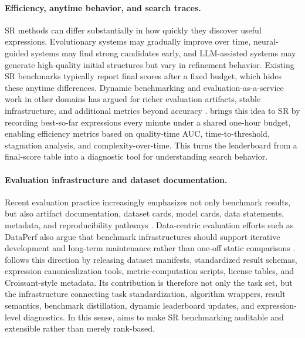 \paragraph{Efficiency, anytime behavior, and search traces.}
SR methods can differ substantially in how quickly they discover useful expressions. Evolutionary systems may gradually improve over time, neural-guided systems may find strong candidates early, and LLM-assisted systems may generate high-quality initial structures but vary in refinement behavior. Existing SR benchmarks typically report final scores after a fixed budget, which hides these anytime differences. Dynamic benchmarking and evaluation-as-a-service work in other domains has argued for richer evaluation artifacts, stable infrastructure, and additional metrics beyond accuracy \citep{kiela2021dynabench,ma2021dynaboard}. \arena{} brings this idea to SR by recording best-so-far expressions every minute under a shared one-hour budget, enabling efficiency metrics based on quality-time AUC, time-to-threshold, stagnation analysis, and complexity-over-time. This turns the leaderboard from a final-score table into a diagnostic tool for understanding search behavior.

\paragraph{Evaluation infrastructure and dataset documentation.}
Recent evaluation practice increasingly emphasizes not only benchmark results, but also artifact documentation, dataset cards, model cards, data statements, metadata, and reproducibility pathways \citep{gebru2021datasheets,mitchell2019modelcards,bender2018datastatements,pushkarna2022datacards,akhtar2024croissant}. Data-centric evaluation efforts such as DataPerf also argue that benchmark infrastructures should support iterative development and long-term maintenance rather than one-off static comparisons \citep{mazumder2023dataperf}. \arena{} follows this direction by releasing dataset manifests, standardized result schemas, expression canonicalization tools, metric-computation scripts, license tables, and Croissant-style metadata. Its contribution is therefore not only the \core{} task set, but the infrastructure connecting task standardization, algorithm wrappers, result semantics, benchmark distillation, dynamic leaderboard updates, and expression-level diagnostics. In this sense, \arena{} aims to make SR benchmarking auditable and extensible rather than merely rank-based.
